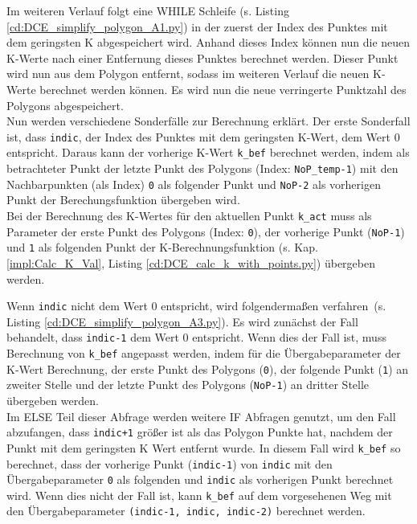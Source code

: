 {	\fi
	Im weiteren Verlauf folgt eine WHILE Schleife \ifimportant(s. Listing \ref{cd:DCE_simplify_polygon_A1.py}) \fi in der zuerst der Index des Punktes mit dem geringsten K abgespeichert wird. Anhand dieses Index können nun die neuen K-Werte nach einer Entfernung dieses Punktes berechnet werden. Dieser Punkt wird nun aus dem Polygon entfernt, sodass im weiteren Verlauf die neuen K-Werte berechnet werden können. Es wird nun die neue verringerte Punktzahl des Polygons abgespeichert. \\
	Nun werden verschiedene Sonderfälle zur Berechnung erklärt. Der erste Sonderfall ist, dass \lstinline|indic|, der Index des Punktes mit dem geringsten K-Wert,  dem Wert 0 entspricht. Daraus kann der vorherige K-Wert \lstinline|k_bef| berechnet werden, indem als betrachteter Punkt der letzte Punkt des Polygons (Index: \lstinline|NoP_temp-1|) mit den Nachbarpunkten (als Index) \lstinline|0|  als folgender Punkt und \lstinline|NoP-2| als vorherigen Punkt der Berechungsfunktion übergeben wird. \\
	Bei der Berechnung des K-Wertes für den aktuellen Punkt \lstinline|k_act| muss als Parameter der erste Punkt des Polygons (Index: \lstinline|0|), der vorherige Punkt (\lstinline|NoP-1|) und \lstinline|1| als folgenden Punkt der K-Berechnungsfunktion (s. Kap. \ref{impl:Calc_K_Val}, Listing \ref{cd:DCE_calc_k_with_points.py}) übergeben werden. \\
	\ifimportant
	
	\fi
	Wenn \lstinline|indic| nicht dem Wert 0 entspricht, wird folgendermaßen verfahren\ifimportant \ (s. Listing \ref{cd:DCE_simplify_polygon_A3.py})\fi.
	Es wird zunächst der Fall behandelt, dass \lstinline|indic-1| dem Wert 0 entspricht. Wenn dies der Fall ist, muss Berechnung von \lstinline|k_bef| angepasst werden, indem für die Übergabeparameter der K-Wert Berechnung, der erste Punkt des Polygons (\lstinline|0|), der folgende Punkt (\lstinline|1|) an zweiter Stelle und der letzte Punkt des Polygons (\lstinline|NoP-1|) an dritter Stelle übergeben werden. \\
	Im ELSE Teil dieser Abfrage werden weitere IF Abfragen genutzt, um den Fall abzufangen, dass \lstinline|indic+1| größer ist als das Polygon Punkte hat, nachdem der Punkt mit dem geringsten K Wert entfernt wurde. In diesem Fall wird \lstinline|k_bef| so berechnet, dass der vorherige Punkt (\lstinline|indic-1|) von \lstinline|indic| mit den Übergabeparameter \lstinline|0| als folgenden und \lstinline|indic| als vorherigen Punkt berechnet wird. Wenn dies nicht der Fall ist, kann \lstinline|k_bef| auf dem vorgesehenen Weg mit den Übergabeparameter \lstinline|(indic-1, indic, indic-2)| berechnet werden. \\

}
